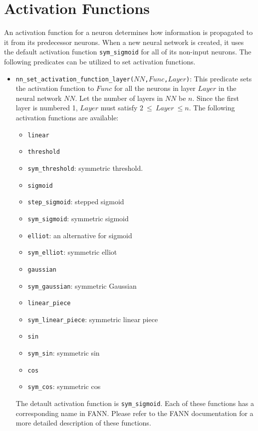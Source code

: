 \section{Activation Functions}
An activation function for a neuron determines how information is propagated to it from its predecessor neurons. When a new neural network is created, it uses the default activation function \texttt{sym\_sigmoid} for all of its non-input neurons. The following predicates can be utilized to set activation functions.

\begin{itemize}
\item \texttt{nn\_set\_activation\_function\_layer($NN$,$Func$,$Layer$)}: This predicate sets the activation function to $Func$ for all the neurons in layer $Layer$ in the neural network $NN$. Let the number of layers in $NN$ be $n$. Since the first layer is numbered 1, $Layer$ must satisfy $2\ \le\ Layer\ \le n$. The following activation functions are available:
\begin{itemize}
\item \texttt{linear}
\item \texttt{threshold}
\item \texttt{sym\_threshold}: symmetric threshold.
\item \texttt{sigmoid}
\item \texttt{step\_sigmoid}: stepped sigmoid
\item \texttt{sym\_sigmoid}: symmetric sigmoid
\item \texttt{elliot}: an alternative for sigmoid
\item \texttt{sym\_elliot}: symmetric elliot
\item \texttt{gaussian}
\item \texttt{sym\_gaussian}: symmetric Gaussian
\item \texttt{linear\_piece}
\item \texttt{sym\_linear\_piece}: symmetric linear piece
\item \texttt{sin}
\item \texttt{sym\_sin}: symmetric sin
\item \texttt{cos}
\item \texttt{sym\_cos}: symmetric cos
\end{itemize}
The detault activation function is \texttt{sym\_sigmoid}. Each of these functions has a corresponding name in FANN. Please refer to the FANN documentation for a more detailed description of these functions.


\end{itemize}
